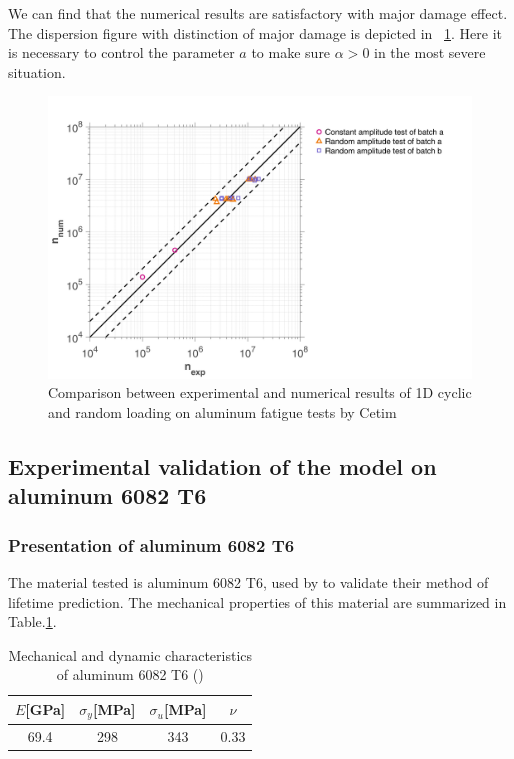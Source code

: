 \documentclass[3p,times,number,review]{elsarticle}
\newcommand{\figref}[1]{\figurename~\ref{#1}}
\begin{document}
We can find that the numerical results are satisfactory with major damage effect. The dispersion figure with distinction of major damage is depicted in \figref{fig.Cetimerr}. Here it is necessary to control the parameter $a$ to make sure $\alpha>0$ in the most severe situation.

\begin{figure}[!h]
\centering
\includegraphics[width=\textwidth]{figures//Cetim_err.png} 
\caption{Comparison between experimental and numerical results of 1D cyclic and random loading on aluminum fatigue tests by Cetim}
\label{fig.Cetimerr}
\end{figure}

\clearpage
\subsection{Experimental validation of the model on aluminum 6082 T6}
\subsubsection{Presentation of aluminum 6082 T6}

The material tested is aluminum 6082 T6, used by \cite{susmel2003multiaxial} to validate their method of lifetime prediction. The mechanical properties of this material are summarized in Table.\ref{tab.al6082t6}.

\begin{table}[!h]
\centering
\begin{tabular}{|c|c|c|c|}
\hline
\textbf{$E${[}GPa{]}} & \textbf{$\sigma_{y}${[}MPa{]}} & \textbf{$\sigma_u${[}MPa{]}} & \textbf{$\nu$} \\ \hline
69.4                                  & 298                                & 343                         & 0.33                 \\ \hline
\end{tabular}
\caption{Mechanical and dynamic characteristics of aluminum 6082 T6 (\cite{susmel2003multiaxial})}
\label{tab.al6082t6}
\end{table}
\end{document}
